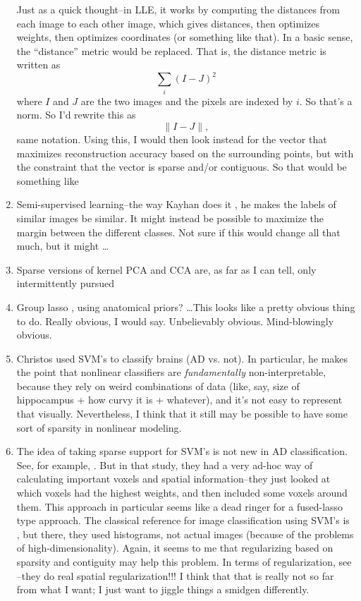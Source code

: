 \documentclass{nih}
\begin{document}
\begin{enumerate}
Just as a quick thought--in LLE, it works by computing the distances from each image to each other image, which gives distances, then optimizes weights, then optimizes coordinates (or something like that).  In a basic sense, the ``distance'' metric would be replaced.  That is, the distance metric is written as 
\begin{equation}
\sum_i \left(I - J \right)^2
\end{equation}
where $I$ and $J$ are the two images and the pixels are indexed by $i$.  So that's a norm.  So I'd rewrite this as 
\begin{equation}
\|I - J\|,
\end{equation}
same notation.  Using this, I would then look instead for the vector that maximizes reconstruction accuracy based on the surrounding points, but with the constraint that the vector is sparse and/or contiguous.  So that would be something like 
\item Semi-supervised learning--the way Kayhan does it \cite{batmanghelich_generative-discriminative_2012,batmanghelich_general_2009}, he makes the labels of similar images be similar. It might instead be possible to maximize the margin between the different classes. Not sure if this would change all that much, but it might \ldots
\item Sparse versions of kernel PCA and CCA are, as far as I can tell, only intermittently pursued
\item Group lasso \cite{yuan_model_2006}, using anatomical priors? \ldots  This looks like a pretty obvious thing to do.  Really obvious, I would say.  Unbelievably obvious.  Mind-blowingly obvious. 
\item Christos \cite{lao_morphological_2004} used SVM's to classify brains (AD vs. not).  In particular, he makes the point that nonlinear classifiers are \textit{fundamentally} non-interpretable, because they rely on weird combinations of data (like, say, size of hippocampus + how curvy it is + whatever), and it's not easy to represent that visually.  Nevertheless, I think that it still may be possible to have some sort of sparsity in nonlinear modeling. 
\item The idea of taking sparse support for SVM's is not new in AD classification.  See, for example, \cite{vemuri_alzheimers_2008}.  But in that study, they had a very ad-hoc way of calculating important voxels and spatial information--they just looked at which voxels had the highest weights, and then included some voxels around them.  This approach in particular seems like a dead ringer for a fused-lasso type approach. The classical reference for image classification using SVM's is \cite{chapelle_support_1999}, but there, they used histograms, not actual images (because of the problems of high-dimensionality).  Again, it seems to me that regularizing based on sparsity and contiguity may help this problem. In terms of regularization, see \cite{cuingnet_spatial_2011}--they do real spatial regularization!!! I think that that is really not so far from what I want; I just want to jiggle things a smidgen differently. 

\end{enumerate}
\end{document}
